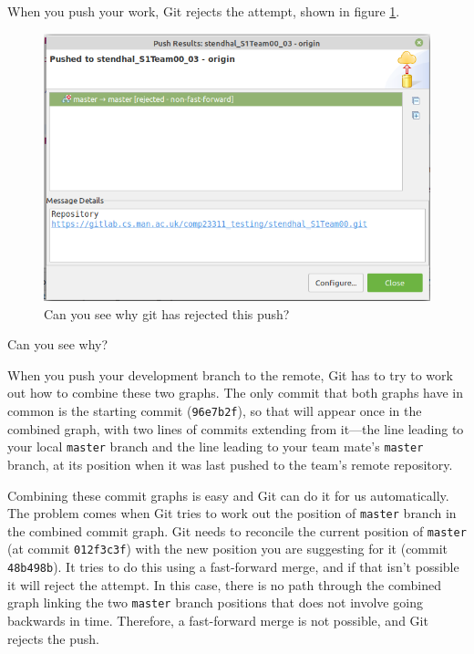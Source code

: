 \documentclass[
]{book}
\begin{document}
When you push your work, Git rejects the attempt, shown in figure \ref{fig:pushRejectedNoHistory-fig}.

\begin{figure}

{\centering \includegraphics[width=1\linewidth]{images/pushRejectedNoHistory} 

}

\caption{Can you see why git has rejected this push?}\label{fig:pushRejectedNoHistory-fig}
\end{figure}

Can you see why?

When you push your development branch to the remote, Git has to try to work out how to combine these two graphs. The only commit that both graphs have in common is the starting commit (\texttt{96e7b2f}), so that will appear once in the combined graph, with two lines of commits extending from it---the line leading to your local \texttt{master} branch and the line leading to your team mate's \texttt{master} branch, at its position when it was last pushed to the team's remote repository.

Combining these commit graphs is easy and Git can do it for us automatically. The problem comes when Git tries to work out the position of \texttt{master} branch in the combined commit graph. Git needs to reconcile the current position of \texttt{master} (at commit \texttt{012f3c3f}) with the new position you are suggesting for it (commit \texttt{48b498b}). It tries to do this using a fast-forward merge, and if that isn't possible it will reject the attempt. In this case, there is no path through the combined graph linking the two \texttt{master} branch positions that does not involve going backwards in time. Therefore, a fast-forward merge is not possible, and Git rejects the push.
\end{document}
